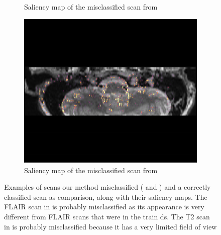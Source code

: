 \begin{figure}[htbp]
\begin{subfigure}[t]{0.25\textwidth}
        \caption{Saliency map of the misclassified \gls{scan} from }\label{fig:RIDER_FLAIR_saliency}
    \end{subfigure}
    \hfill
    \begin{subfigure}[t]{0.25\textwidth}
        \centering
        \includegraphics[width=\textwidth]{Figures/Appendix/Saliency_T2_hippo.pdf}
        \caption{Saliency map of the misclassified \gls{scan} from }\label{fig:T2_hippo_saliency}
    \end{subfigure}

\caption{Examples of \glspl{scan} our method misclassified ( and ) and a correctly classified \gls{scan}  as comparison, along with their saliency maps.
The \gls{FLAIR} \gls{scan} in  is probably misclassified as its appearance is very different from \gls{FLAIR} \glspl{scan} that were in the train \gls{ds}.
The \gls{T2} \gls{scan} in  is probably misclassified because it has a very limited field of view}\label{fig:FLAIR_comparison}

\end{figure}


